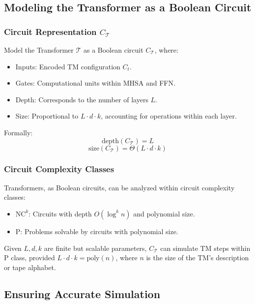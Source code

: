 \subsection{Modeling the Transformer as a Boolean Circuit}

\subsubsection{Circuit Representation \( C_{\mathcal{T}} \)}
Model the Transformer \( \mathcal{T} \) as a Boolean circuit \( C_{\mathcal{T}} \), where:
\begin{itemize}
    \item {Inputs}: Encoded TM configuration \( C_t \).
    \item {Gates}: Computational units within MHSA and FFN.
    \item {Depth}: Corresponds to the number of layers \( L \).
    \item {Size}: Proportional to \( L \cdot d \cdot k \), accounting for operations within each layer.
\end{itemize}

Formally:
\[
\text{depth}(C_{\mathcal{T}}) = L
\]
\[
\text{size}(C_{\mathcal{T}}) = \Theta(L \cdot d \cdot k)
\]

\subsubsection{Circuit Complexity Classes}
Transformers, as Boolean circuits, can be analyzed within circuit complexity classes:
\begin{itemize}
    \item \( \text{NC}^k \): Circuits with depth \( O(\log^k n) \) and polynomial size.
    \item \( \text{P} \): Problems solvable by circuits with polynomial size.
\end{itemize}

Given \( L, d, k \) are finite but scalable parameters, \( C_{\mathcal{T}} \) can simulate TM steps within \( \text{P} \) class, provided \( L \cdot d \cdot k = \text{poly}(n) \), where \( n \) is the size of the TM's description or tape alphabet.



\subsection{Ensuring Accurate Simulation}\label{appendix:A5}

